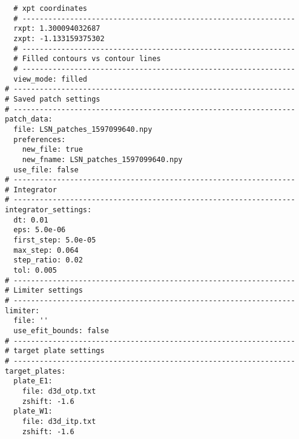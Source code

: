 \begin{lstlisting}
  # xpt coordinates
  # ---------------------------------------------------------------
  rxpt: 1.300094032687
  zxpt: -1.133159375302
  # ---------------------------------------------------------------
  # Filled contours vs contour lines
  # ---------------------------------------------------------------
  view_mode: filled
# -----------------------------------------------------------------
# Saved patch settings
# -----------------------------------------------------------------
patch_data:
  file: LSN_patches_1597099640.npy
  preferences:
    new_file: true
    new_fname: LSN_patches_1597099640.npy
  use_file: false
# -----------------------------------------------------------------
# Integrator
# -----------------------------------------------------------------
integrator_settings:
  dt: 0.01
  eps: 5.0e-06
  first_step: 5.0e-05
  max_step: 0.064
  step_ratio: 0.02
  tol: 0.005
# -----------------------------------------------------------------
# Limiter settings
# -----------------------------------------------------------------
limiter:
  file: ''
  use_efit_bounds: false
# -----------------------------------------------------------------
# target plate settings
# -----------------------------------------------------------------
target_plates:
  plate_E1:
    file: d3d_otp.txt
    zshift: -1.6
  plate_W1:
    file: d3d_itp.txt
    zshift: -1.6
\end{lstlisting}
